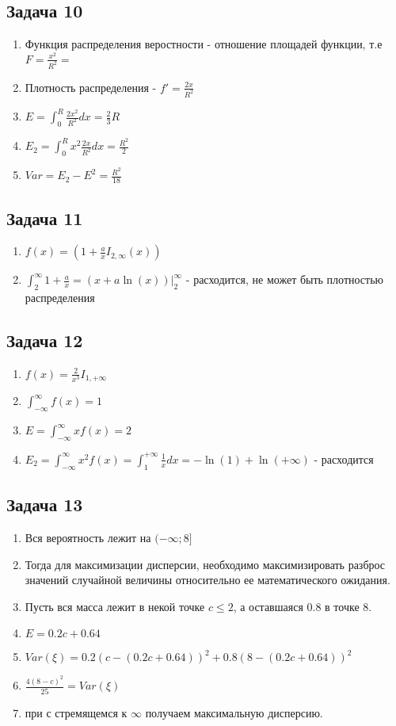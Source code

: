 \documentclass[a4paper,12pt]{article}
\begin{document}
\subsection{Задача 10}
\begin{enumerate}
    \item Функция распределения веростности - отношение площадей функции, т.е $F = \frac{x^2}{R^2}=$
    \item Плотность распределения - $f' = \frac{2x}{R^2}$
    \item $E = \int_{0}^{R} \frac{2x^2}{R^2}dx = \frac{2}{3}R$
    \item $E_2 = \int_{0}^{R} x^2\frac{2x}{R^2}dx=\frac{R^2}{2}$
    \item $Var = E_2-E^2=\frac{R^2}{18}$
\end{enumerate}

\subsection{Задача 11}
\begin{enumerate}
    \item $f(x)=(1+\frac{a}{x}I_{2, \infty}(x))$
    \item $\int_{2}^{\infty} 1+\frac{a}{x} = (x+a\ln(x))|_{2}^{\infty}$ - расходится, не может быть плотностью распределения
\end{enumerate}

\subsection{Задача 12}
\begin{enumerate}
    \item $f(x) = \frac{2}{x^3}I_{1, +\infty}$
    \item $\int_{-\infty}^{\infty} f(x) = 1$
    \item $E = \int_{-\infty}^{\infty} xf(x)= 2$
    \item $E_2 = \int_{-\infty}^{\infty} x^2f(x) = \int_{1}^{+\infty} \frac{1}{x} dx = -\ln(1) + \ln(+\infty)$ - расходится
\end{enumerate}

\subsection{Задача 13}
\begin{enumerate}
    \item Вся вероятность лежит на $(-\infty; 8]$
    \item Тогда для максимизации дисперсии, необходимо максимизировать разброс значений случайной величины относительно ее математического ожидания.
    \item Пусть вся масса лежит в некой точке $c \le 2$, а оставшаяся $0.8$ в точке 8.
    \item $E = 0.2c+0.64$
    \item $Var(\xi) = 0.2(c-(0.2c+0.64))^2+0.8(8-(0.2c+0.64))^2$
    \item $\frac{4(8-c)^2}{25}=Var(\xi) $
    \item при с стремящемся к $\infty$ получаем максимальную дисперсию.
\end{enumerate}
\end{document}
